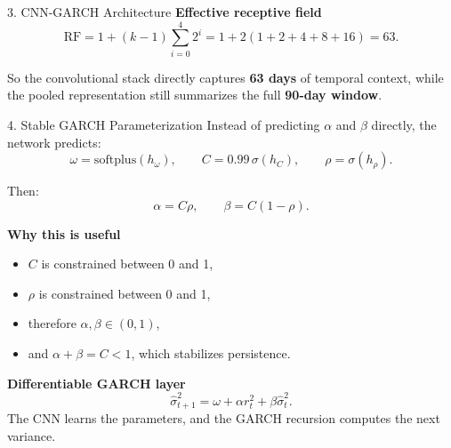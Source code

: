 \documentclass[final]{beamer}
\newlength{\colwidth}
\begin{document}
\begin{frame}[t]
\begin{columns}[t,totalwidth=\textwidth]
\begin{column}{\colwidth}
\begin{block}{3. CNN-GARCH Architecture}
\textbf{Effective receptive field}
\[
\mathrm{RF} = 1 + (k-1)\sum_{i=0}^{4} 2^i
            = 1 + 2(1+2+4+8+16) = 63.
\]

So the convolutional stack directly captures \textbf{63 days} of temporal context,
while the pooled representation still summarizes the full \textbf{90-day window}.

\begin{center}
\end{center}
\end{block}

\begin{block}{4. Stable GARCH Parameterization}
\small
Instead of predicting \(\alpha\) and \(\beta\) directly, the network predicts:
\[
\omega = \mathrm{softplus}(h_\omega),\qquad
C = 0.99\,\sigma(h_C),\qquad
\rho = \sigma(h_\rho).
\]

Then:
\[
\alpha = C\rho,\qquad
\beta = C(1-\rho).
\]

\textbf{Why this is useful}
\begin{itemize}
\item \(C\) is constrained between 0 and 1,
\item \(\rho\) is constrained between 0 and 1,
\item therefore \(\alpha,\beta \in (0,1)\),
\item and \(\alpha + \beta = C < 1\), which stabilizes persistence.
\end{itemize}

\textbf{Differentiable GARCH layer}
\[
\hat{\sigma}_{t+1}^2 = \omega + \alpha r_t^2 + \beta \hat{\sigma}_t^2.
\]
The CNN learns the parameters, and the GARCH recursion computes the next variance.
\end{block}


\end{column}
\end{columns}
\end{frame}
\end{document}
